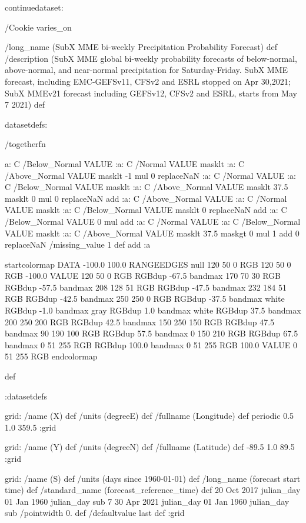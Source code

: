 \begin{ingrid}

continuedataset:


/Cookie varies_on


/long_name (SubX MME bi-weekly Precipitation Probability Forecast) def
/description (SubX MME global bi-weekly probability forecasts of below-normal, above-normal, and near-normal precipitation for Saturday-Friday. SubX MME forecast, including EMC-GEFSv11, CFSv2 and ESRL stopped on Apr 30,2021; SubX MMEv21 forecast including GEFSv12, CFSv2 and ESRL, starts from May 7 2021) def

datasetdefs:

/togetherfn {
 a:
    C /Below_Normal VALUE
    :a:
     C /Normal VALUE
     masklt
    :a:
     C /Above_Normal VALUE
     masklt
    -1 mul
    0 replaceNaN
    :a:
     C /Normal VALUE
     :a:
      C /Below_Normal VALUE
      masklt
     :a:
      C /Above_Normal VALUE
      masklt
     37.5 masklt
     0 mul
     0 replaceNaN           
     add
    :a:
     C /Above_Normal VALUE
     :a:
      C /Normal VALUE
      masklt
     :a:
      C /Below_Normal VALUE
      masklt
     0 replaceNaN
     add
 :a:
     C /Below_Normal VALUE
     0 mul
     add
    :a:
     C /Normal VALUE
     :a:
      C /Below_Normal VALUE
      masklt
     :a:
      C /Above_Normal VALUE        
      masklt
     37.5 maskgt
     0 mul
     1 add
     0 replaceNaN
     /missing_value 1 def
     add
    :a

startcolormap
DATA -100.0 100.0 RANGEEDGES
null 120 50 0 RGB
120 50 0 RGB -100.0 VALUE
120 50 0 RGB RGBdup -67.5 bandmax
170 70 30 RGB RGBdup -57.5 bandmax
208 128 51 RGB RGBdup -47.5 bandmax
232 184 51 RGB RGBdup -42.5 bandmax
250 250 0 RGB RGBdup -37.5 bandmax
white RGBdup -1.0 bandmax
gray RGBdup 1.0 bandmax
white RGBdup 37.5 bandmax
200 250 200 RGB RGBdup 42.5 bandmax
150 250 150 RGB RGBdup 47.5 bandmax
90 190 100 RGB RGBdup 57.5 bandmax
0 150 210 RGB RGBdup 67.5 bandmax
0 51 255 RGB RGBdup 100.0 bandmax
0 51 255 RGB 100.0 VALUE
0 51 255 RGB
endcolormap
} def 

:datasetdefs


grid:
/name (X) def
/units (degreeE) def
/fullname (Longitude) def
periodic
0.5 1.0 359.5
:grid

grid:
/name (Y) def
/units (degreeN) def
/fullname (Latitude) def
-89.5 1.0 89.5
:grid


grid:
/name (S) def
/units (days since 1960-01-01) def
/long_name (forecast start time) def
/standard_name (forecast_reference_time) def
20 Oct 2017 julian_day 01 Jan 1960 julian_day sub
7
30 Apr 2021 julian_day 01 Jan 1960 julian_day sub
/pointwidth 0. def
/defaultvalue { last } def
:grid


\end{ingrid}
